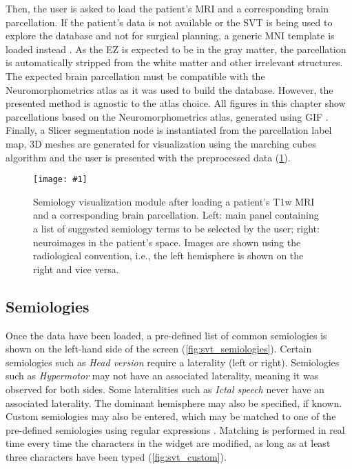 Then, the user is asked to load the patient's \ac{MRI} and a corresponding brain parcellation.
If the patient's data is not available or the \ac{SVT} is being used to explore the database and not for surgical planning, a generic \ac{MNI} template is loaded instead \cite{fonov_unbiased_2009}.
As the \ac{EZ} is expected to be in the gray matter, the parcellation is automatically stripped from the white matter and other irrelevant structures.
The expected brain parcellation must be compatible with the Neuromorphometrics atlas as it was used to build the \svtdatabase database.
However, the presented method is agnostic to the atlas choice.
All figures in this chapter show parcellations based on the Neuromorphometrics atlas, generated using \ac{GIF} \cite{cardoso_geodesic_2015}.
Finally, a Slicer segmentation node is instantiated from the parcellation label map, 3D meshes are generated for visualization using the marching cubes algorithm \cite{lorensen_marching_1987,pinter_polymorph_2019} and the user is presented with the preprocessed data (\cref{fig:svt_loaded}).

\newcommand{\svtscreenshot}[1]{
  \texttt{[image: \#1]}
}

\begin{figure}
  \centering
  \svtscreenshot{svt_loaded_patient}
  \caption[Semiology visualization module after loading a patient's data]{
    Semiology visualization module after loading a patient's \ac{T1w} \ac{MRI} and a corresponding brain parcellation.
    Left: main panel containing a list of suggested semiology terms to be selected by the user;
    right: neuroimages in the patient's space.
    Images are shown using the radiological convention, i.e., the left hemisphere is shown on the right and vice versa.
  }
  \label{fig:svt_loaded}
\end{figure}


\subsection{Semiologies}

Once the data have been loaded, a pre-defined list of common semiologies is shown on the left-hand side of the screen (\cref{fig:svt_semiologies}).
Certain semiologies such as \textit{Head version} require a laterality (left or right).
Semiologies such as \textit{Hypermotor} may not have an associated laterality, meaning it was observed for both sides.
Some lateralities such as \textit{Ictal speech} never have an associated laterality.
The dominant hemisphere may also be specified, if known.
Custom semiologies may also be entered, which may be matched to one of the pre-defined semiologies using regular expressions \cite{alim-marvasti_mapping_2021}.
Matching is performed in real time every time the characters in the widget are modified, as long as at least three characters have been typed (\cref{fig:svt_custom}).

